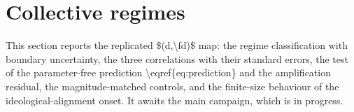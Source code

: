 \section{Collective regimes}
\label{sec:regimes}

\num{This section reports the replicated $(d,\fd)$ map: the regime classification
with boundary uncertainty, the three correlations with their standard errors, the
test of the parameter-free prediction \eqref{eq:prediction} and the amplification
residual, the magnitude-matched controls, and the finite-size behaviour of the
ideological-alignment onset. It awaits the main campaign, which is in progress.}

